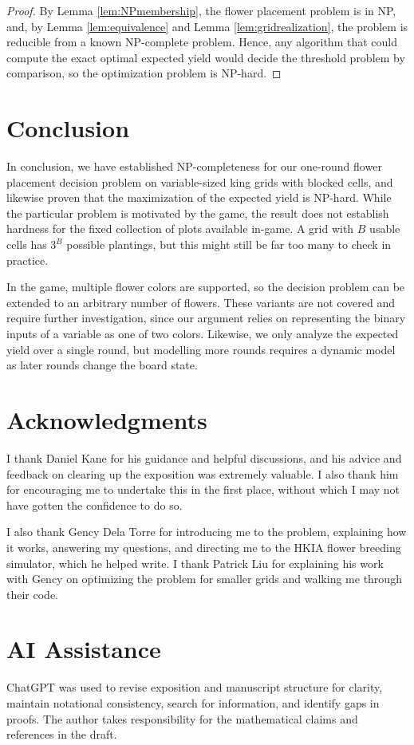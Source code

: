 \documentclass[11pt]{article}
\theoremstyle{plain}
\begin{document}
\begin{proof}
    By Lemma \ref{lem:NPmembership}, the flower placement problem is in NP, and, by Lemma \ref{lem:equivalence} and Lemma \ref{lem:gridrealization}, the problem is reducible from a known NP-complete problem. Hence, any algorithm that could compute the exact optimal expected yield would decide the threshold problem by comparison, so the optimization problem is NP-hard.
\end{proof}

\section{Conclusion}

In conclusion, we have established NP-completeness for our one-round flower placement decision problem on variable-sized king grids with blocked cells, and likewise proven that the maximization of the expected yield is NP-hard. While the particular problem is motivated by the game, the result does not establish hardness for the fixed collection of plots available in-game. A grid with $B$ usable cells has $3^B$ possible plantings, but this might still be far too many to check in practice. 

In the game, multiple flower colors are supported, so the decision problem can be extended to an arbitrary number of flowers. These variants are not covered and require further investigation, since our argument relies on representing the binary inputs of a variable as one of two colors. Likewise, we only analyze the expected yield over a single round, but modelling more rounds requires a dynamic model as later rounds change the board state. 

\section*{Acknowledgments}

I thank Daniel Kane for his guidance and helpful discussions, and his advice and feedback on clearing up the exposition was extremely valuable. I also thank him for encouraging me to undertake this in the first place, without which I may not have gotten the confidence to do so.

I also thank Gency Dela Torre for introducing me to the problem, explaining how it works, answering my questions, and directing me to the HKIA flower breeding simulator, which he helped write. I thank Patrick Liu for explaining his work with Gency on optimizing the problem for smaller grids and walking me through their code.

\section*{AI Assistance}

ChatGPT was used to revise exposition and manuscript structure for clarity, maintain notational consistency, search for information, and identify gaps in proofs. The author takes responsibility for the mathematical claims and references in the draft.



\end{document}
